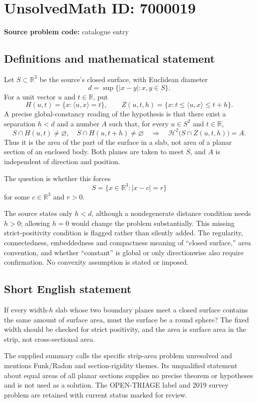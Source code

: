 \documentclass[11pt]{article}
\newcommand{\R}{\mathbb{R}}
\begin{document}
\section*{UnsolvedMath ID: 7000019}
\textbf{Source problem code:} catalogue entry
\subsection{Definitions and mathematical statement}
Let $S\subset\R^3$ be the source's closed surface, with Euclidean diameter
\[
 d=\sup\{|x-y|:x,y\in S\}.
\]
For a unit vector $u$ and $t\in\R$, put
\[
 H(u,t)=\{x:\langle u,x\rangle=t\},\qquad
 Z(u,t,h)=\{x:t\le\langle u,x\rangle\le t+h\}.
\]
A precise global-constancy reading of the hypothesis is that there exist a separation $h<d$ and a number $A$ such that, for every $u\in S^2$ and $t\in\R$,
\[
 S\cap H(u,t)\ne\varnothing,\quad
 S\cap H(u,t+h)\ne\varnothing
 \quad\Longrightarrow\quad
 \mathcal H^2\bigl(S\cap Z(u,t,h)\bigr)=A.
\]
Thus it is the area of the part of the surface in a slab, not area of a planar section of an enclosed body. Both planes are taken to meet $S$, and $A$ is independent of direction and position.

The question is whether this forces
\[
 S=\{x\in\R^3:|x-c|=r\}
\]
for some $c\in\R^3$ and $r>0$.

The source states only $h<d$, although a nondegenerate distance condition needs $h>0$; allowing $h=0$ would change the problem substantially. This missing strict-positivity condition is flagged rather than silently added. The regularity, connectedness, embeddedness and compactness meaning of ``closed surface,'' area convention, and whether ``constant'' is global or only directionwise also require confirmation. No convexity assumption is stated or imposed.
\subsection{Short English statement}
If every width-$h$ slab whose two boundary planes meet a closed surface contains the same amount of surface area, must the surface be a round sphere? The fixed width should be checked for strict positivity, and the area is surface area in the strip, not cross-sectional area.

The supplied summary calls the specific strip-area problem unresolved and mentions Funk/Radon and section-rigidity themes. Its unqualified statement about equal areas of all planar sections supplies no precise theorem or hypotheses and is not used as a solution. The OPEN-TRIAGE label and 2019 survey problem are retained with current status marked for review.
\end{document}
